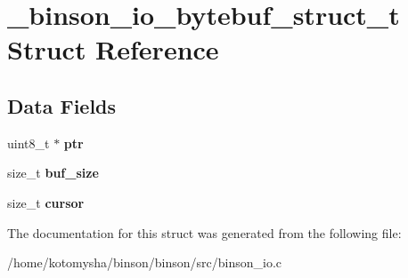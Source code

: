 \hypertarget{struct__binson__io__bytebuf__struct__t}{\section{\-\_\-binson\-\_\-io\-\_\-bytebuf\-\_\-struct\-\_\-t Struct Reference}
\label{struct__binson__io__bytebuf__struct__t}
}
\subsection*{Data Fields}
\begin{DoxyCompactItemize}
\item 
\hypertarget{struct__binson__io__bytebuf__struct__t_aaa8222c604b0b520bc2205ddcc42d855}{uint8\-\_\-t $\ast$ {\bfseries ptr}}\label{struct__binson__io__bytebuf__struct__t_aaa8222c604b0b520bc2205ddcc42d855}

\item 
\hypertarget{struct__binson__io__bytebuf__struct__t_ae6563dde7454192031694b48405393d7}{size\-\_\-t {\bfseries buf\-\_\-size}}\label{struct__binson__io__bytebuf__struct__t_ae6563dde7454192031694b48405393d7}

\item 
\hypertarget{struct__binson__io__bytebuf__struct__t_a403f38d209b4f402839b1963c1be7a98}{size\-\_\-t {\bfseries cursor}}\label{struct__binson__io__bytebuf__struct__t_a403f38d209b4f402839b1963c1be7a98}

\end{DoxyCompactItemize}


The documentation for this struct was generated from the following file\-:\begin{DoxyCompactItemize}
\item 
/home/kotomysha/binson/binson/src/binson\-\_\-io.\-c\end{DoxyCompactItemize}
